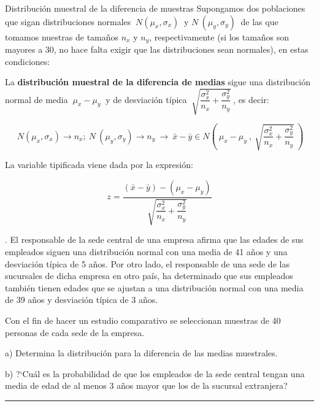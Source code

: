 \begin{myalertblock}{Distribución muestral de la diferencia de muestras}
\vspace{2mm} Supongamos dos poblaciones que sigan distribuciones normales $ \ N(\mu_x,\sigma_x) \ $ y $N \ (\mu_y,\sigma_y) \ $ de las que tomamos nuestras de tamaños $n_x$ y $n_y$, respectivamente (si los tamaños son mayores a 30, no hace falta exigir que las distribuciones sean normales), en estas condiciones:
	
\vspace{2mm} La \textbf{distribución muestral de la diferencia de medias} sigue una distribución normal de media $\ \mu_x - \mu_y \ $ y de desviación típica $ \ \sqrt{\dfrac {\sigma_x^2}{n_x} +\dfrac {\sigma_y^2}{n_y}}   \ $, es decir:
	
$$  \ N(\mu_x,\sigma_x)  \to n_x;\    N \ (\mu_y,\sigma_y) \to n_y \ \rightarrow \ \bar x - \bar y \in N\left( \ \mu_x-\mu_y \ , \ \sqrt{\dfrac {\sigma_x^2}{n_x} +\dfrac {\sigma_y^2}{n_y}} \ \right) $$
	
\vspace{2mm} La variable tipificada viene dada por la expresión:
	
\vspace{2mm} $$ z=\dfrac{(\bar x-\bar y)-(\mu_x-\mu_y)}{ \sqrt{\dfrac {\sigma_x^2}{n_x} +\dfrac {\sigma_y^2}{n_y}} } $$

\begin{example}
.	El responsable de la sede central de una empresa afirma que las edades de sus empleados siguen una distribución normal con una media de 41 años y una desviación típica de 5 años. Por otro lado, el responsable de una sede de las sucursales de dicha empresa en otro país, ha determinado que sus empleados también tienen edades que se ajustan a una distribución normal con una media de 39 años y desviación típica de 3 años. 

\vspace{2mm} Con el fin de hacer un estudio comparativo se seleccionan muestras de 40 personas de cada sede de la empresa. 

\vspace{2mm} a)    Determina la distribución para la diferencia de las medias muestrales. 

\vspace{2mm} b)    ?`Cuál es la probabilidad de que los empleados de la sede central tengan una media de edad de al menos 3 años mayor que los de la sucursal extranjera?	

\rule{150pt}{0.1pt}


\end{example}
\end{myalertblock}
